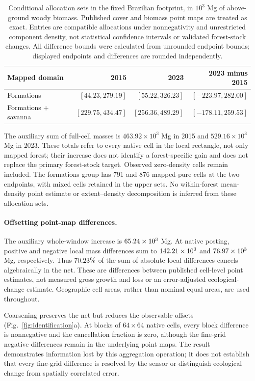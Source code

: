 \documentclass[11pt,a4paper]{article}
\begin{document}
\begin{table}[htbp]
\centering\small
\caption{Conditional allocation sets in the fixed Brazilian footprint, in $10^3$ Mg of above-ground woody biomass. Published cover and biomass point maps are treated as exact. Entries are compatible allocations under nonnegativity and unrestricted component density, not statistical confidence intervals or validated forest-stock changes. All difference bounds were calculated from unrounded endpoint bounds; displayed endpoints and differences are rounded independently.}\label{tab:allocation}
\begin{tabular}{lrrr}
\toprule
Mapped domain & 2015 & 2023 & 2023 minus 2015\\\midrule
Formations & $[44.23, 279.19]$ & $[55.22, 326.23]$ & $[-223.97, 282.00]$ \\
Formations + savanna & $[229.75, 434.47]$ & $[256.36, 489.29]$ & $[-178.11, 259.53]$ \\
\bottomrule
\end{tabular}
\end{table}

The auxiliary sum of full-cell masses is $463.92\times10^3$ Mg in 2015 and $529.16\times10^3$ Mg in 2023. These totals refer to every native cell in the local rectangle, not only mapped forest; their increase does not identify a forest-specific gain and does not replace the primary forest-stock target. Observed zero-density cells remain included. The formations group has 791 and 876 mapped-pure cells at the two endpoints, with mixed cells retained in the upper sets. No within-forest mean-density point estimate or extent--density decomposition is inferred from these allocation sets.

\paragraph{Offsetting point-map differences.}
The auxiliary whole-window increase is $65.24\times10^3$ Mg. At native posting, positive and negative local mass differences sum to $142.21\times10^3$ and $76.97\times10^3$ Mg, respectively. Thus $70.23\%$ of the sum of absolute local differences cancels algebraically in the net. These are differences between published cell-level point estimates, not measured gross growth and loss or an error-adjusted ecological-change estimate. Geographic cell areas, rather than nominal equal areas, are used throughout.

Coarsening preserves the net but reduces the observable offsets (Fig.~\ref{fig:identification}a). At blocks of $64\times64$ native cells, every block difference is nonnegative and the cancellation fraction is zero, although the fine-grid negative differences remain in the underlying point maps. The result demonstrates information lost by this aggregation operation; it does not establish that every fine-grid difference is resolved by the sensor or distinguish ecological change from spatially correlated error.
\end{document}

